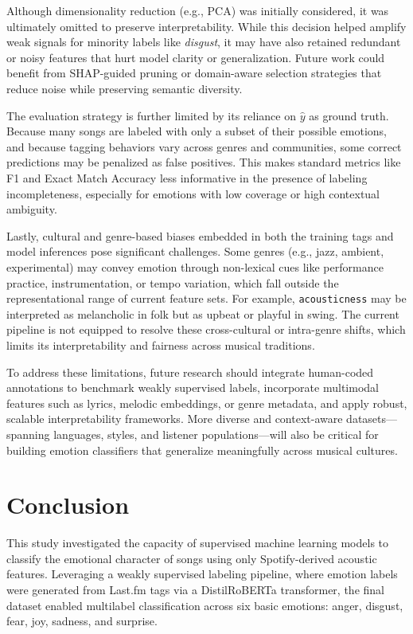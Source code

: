 \documentclass{article}
\begin{document}
Although dimensionality reduction (e.g., PCA) was initially considered, it was ultimately omitted to preserve interpretability. While this decision helped amplify weak signals for minority labels like \textit{disgust}, it may have also retained redundant or noisy features that hurt model clarity or generalization. Future work could benefit from SHAP-guided pruning or domain-aware selection strategies that reduce noise while preserving semantic diversity.

The evaluation strategy is further limited by its reliance on $\hat{y}$ as ground truth. Because many songs are labeled with only a subset of their possible emotions, and because tagging behaviors vary across genres and communities, some correct predictions may be penalized as false positives. This makes standard metrics like F1 and Exact Match Accuracy less informative in the presence of labeling incompleteness, especially for emotions with low coverage or high contextual ambiguity.

Lastly, cultural and genre-based biases embedded in both the training tags and model inferences pose significant challenges. Some genres (e.g., jazz, ambient, experimental) may convey emotion through non-lexical cues like performance practice, instrumentation, or tempo variation, which fall outside the representational range of current feature sets. For example, \texttt{acousticness} may be interpreted as melancholic in folk but as upbeat or playful in swing. The current pipeline is not equipped to resolve these cross-cultural or intra-genre shifts, which limits its interpretability and fairness across musical traditions.

To address these limitations, future research should integrate human-coded annotations to benchmark weakly supervised labels, incorporate multimodal features such as lyrics, melodic embeddings, or genre metadata, and apply robust, scalable interpretability frameworks. More diverse and context-aware datasets—spanning languages, styles, and listener populations—will also be critical for building emotion classifiers that generalize meaningfully across musical cultures.



\section{Conclusion}

This study investigated the capacity of supervised machine learning models to classify the emotional character of songs using only Spotify-derived acoustic features. Leveraging a weakly supervised labeling pipeline, where emotion labels were generated from Last.fm tags via a DistilRoBERTa transformer, the final dataset enabled multilabel classification across six basic emotions: anger, disgust, fear, joy, sadness, and surprise.
\end{document}
